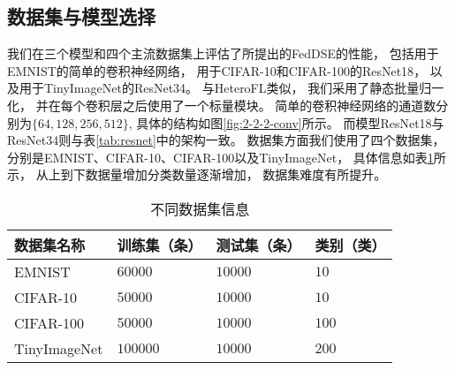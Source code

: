 \subsection{数据集与模型选择}
\label{sec:feddsedata_model}
我们在三个模型和四个主流数据集上评估了所提出的FedDSE的性能，
包括用于EMNIST\cite{lecun1998mnist}的简单的卷积神经网络，
用于CIFAR-10和CIFAR-100\cite{krizhevsky2009learning}的ResNet18\cite{shafiq2022deep}，
以及用于TinyImageNet\cite{le2015tiny}的ResNet34。
与HeteroFL\cite{diao2020heterofl}类似，
我们采用了静态批量归一化，
并在每个卷积层之后使用了一个标量模块。
简单的卷积神经网络的通道数分别为$\{ 64, 128, 256, 512 \}$,
具体的结构如图\ref{fig:2-2-2-conv}所示。
而模型ResNet18与ResNet34则与表\ref{tab:resnet}中的架构一致。
数据集方面我们使用了四个数据集，
分别是EMNIST、CIFAR-10、CIFAR-100以及TinyImageNet，
具体信息如表\ref{tab:datasets}所示，
从上到下数据量增加分类数量逐渐增加，
数据集难度有所提升。
\begin{table}[thbp]
    \caption{\label{tab:datasets}不同数据集信息}
    \begin{tabularx}{\linewidth}{l X<{\centering} X<{\centering} X<{\centering}}
        \toprule
        数据集名称 & 训练集（条） & 测试集（条） & 类别（类） \\ \hline
        EMNIST & $60000$ & $10000$ & $10$ \\ 
        CIFAR-10 & $50000$ & $10000$ & $10$ \\ 
        CIFAR-100 & $50000$ & $10000$ & $100$ \\ 
        TinyImageNet & $100000$ & $10000$ & $200$ \\ 
        \bottomrule
    \end{tabularx}
\end{table}
